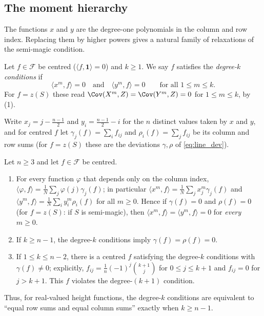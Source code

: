 \subsection{The moment hierarchy}
\label{sec:theory_hierarchy}

The functions $x$ and $y$ are the degree-one polynomials in the column and row index.  Replacing them by
higher powers gives a natural family of relaxations of the semi-magic condition.

\begin{definition}
\label{def:degree_k}
Let $f\in\mathcal F$ be centred ($\langle f,\mathbf 1\rangle=0$) and $k\ge1$.  We say $f$ satisfies the
\emph{degree-$k$ conditions} if
\[
\langle x^{m},f\rangle=0\quad\text{and}\quad\langle y^{m},f\rangle=0\qquad\text{for all }1\le m\le k .
\]
For $f=z(S)$ these read $\Cov(X^{m},Z)=\Cov(Y^{m},Z)=0$ for $1\le m\le k$, by (1).
\end{definition}

Write $x_j=j-\frac{n-1}2$ and $y_i=\frac{n-1}2-i$ for the $n$ distinct values taken by $x$ and $y$, and
for centred $f$ let $\gamma_j(f)=\sum_i f_{ij}$ and $\rho_i(f)=\sum_j f_{ij}$ be its column and row sums
(for $f=z(S)$ these are the deviations $\gamma,\rho$ of \eqref{eq:line_dev}).

\begin{theorem}
\label{thm:hierarchy}
Let $n\ge3$ and let $f\in\mathcal F$ be centred.
\begin{enumerate}
\item[(a)] For every function $\varphi$ that depends only on the column index, $\langle\varphi,f\rangle=\frac1N\sum_j\varphi(j)\gamma_j(f)$;
in particular $\langle x^{m},f\rangle=\frac1N\sum_j x_j^{m}\gamma_j(f)$ and $\langle y^{m},f\rangle=\frac1N\sum_i y_i^{m}\rho_i(f)$ for all $m\ge0$.
Hence if $\gamma(f)=0$ and $\rho(f)=0$ (for $f=z(S)$: if $S$ is semi-magic), then
$\langle x^{m},f\rangle=\langle y^{m},f\rangle=0$ for \emph{every} $m\ge0$.
\item[(b)] If $k\ge n-1$, the degree-$k$ conditions imply $\gamma(f)=\rho(f)=0$.
\item[(c)] If $1\le k\le n-2$, there is a centred $f$ satisfying the degree-$k$ conditions with $\gamma(f)\ne0$;
explicitly, $f_{ij}=\frac1n(-1)^{j}\binom{k+1}{j}$ for $0\le j\le k+1$ and $f_{ij}=0$ for $j>k+1$.
This $f$ violates the degree-$(k+1)$ condition.
\end{enumerate}
Thus, for real-valued height functions, the degree-$k$ conditions are equivalent to ``equal row sums and equal
column sums'' exactly when $k\ge n-1$.
\end{theorem}

